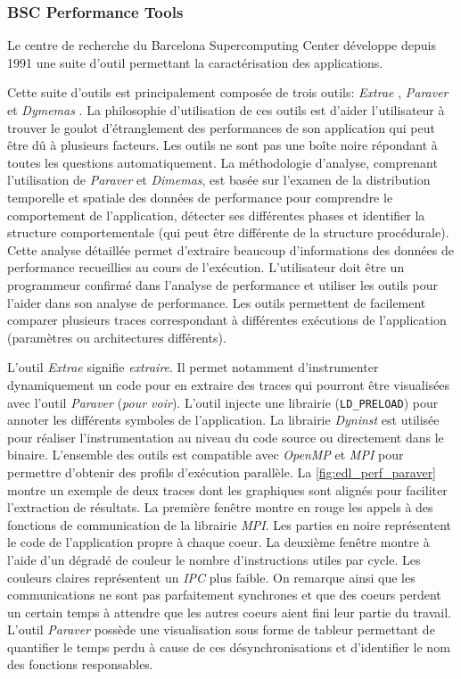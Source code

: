         \subsubsection{BSC Performance Tools}
        Le centre de recherche du Barcelona Supercomputing Center développe depuis 1991 une suite d'outil permettant la caractérisation des applications. 
        
        Cette suite d'outils est principalement composée de trois outils: \textit{Extrae} \cite{Rodriguez}, \textit{Paraver} \cite{Pillet1995} et \textit{Dymemas} \cite{Labarta1997}. La philosophie d'utilisation de ces outils est d'aider l'utilisateur à trouver le goulot d'étranglement des performances de son application qui peut être dû à plusieurs facteurs. Les outils ne sont pas une boîte noire répondant à toutes les questions automatiquement. La méthodologie d'analyse, comprenant l'utilisation de \textit{Paraver} et \textit{Dimemas}, est basée sur l'examen de la distribution temporelle et spatiale des données de performance pour comprendre le comportement de l'application, détecter ses différentes phases et identifier la structure comportementale (qui peut être différente de la structure procédurale). Cette analyse détaillée permet d'extraire beaucoup d'informations des données de performance recueillies au cours de l'exécution. L'utilisateur doit être un programmeur confirmé dans l'analyse de performance et utiliser les outils pour l'aider dans son analyse de performance. Les outils permettent de facilement comparer plusieurs traces correspondant à différentes exécutions de l'application (paramètres ou architectures différents). 
        
        L'outil \textit{Extrae} signifie \textit{extraire}. Il permet notamment d'instrumenter dynamiquement un code pour en extraire des traces qui pourront être visualisées avec l'outil \textit{Paraver} (\textit{pour voir}). L'outil injecte une librairie (\verb=LD_PRELOAD=) pour annoter les différents symboles de l'application. La librairie \textit{Dyninst} est utilisée pour réaliser l'instrumentation au niveau du code source ou directement dans le binaire. L'ensemble des outils est compatible avec \textit{OpenMP} et \textit{MPI} pour permettre d'obtenir des profils d'exécution parallèle. La \autoref{fig:edl_perf_paraver} montre un exemple de deux traces dont les graphiques sont alignés pour faciliter l'extraction de résultats. La première fenêtre montre en rouge les appels à des fonctions de communication de la librairie \textit{MPI}. Les parties en noire représentent le code de l'application propre à chaque coeur. La deuxième fenêtre montre à l'aide d'un dégradé de couleur le nombre d'instructions utiles par cycle. Les couleurs claires représentent un \textit{IPC} plus faible. On remarque ainsi que les communications ne sont pas parfaitement synchrones et que des coeurs perdent un certain temps à attendre que les autres coeurs aient fini leur partie du travail. L'outil \textit{Paraver} possède une visualisation sous forme de tableur permettant de quantifier le temps perdu à cause de ces désynchronisations et d'identifier le nom des fonctions responsables.  
        
